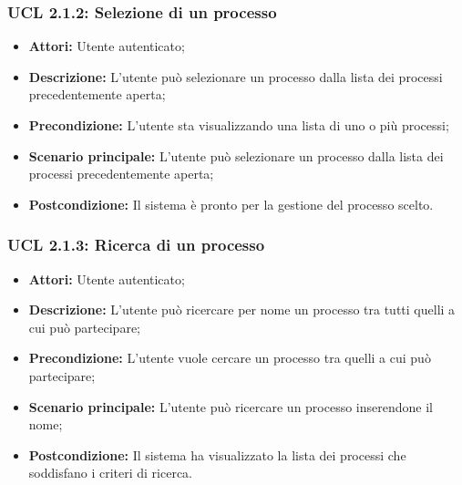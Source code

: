 \hypertarget{L2.1.2}{}
\subsubsection{UCL 2.1.2: Selezione di un processo}
\begin{itemize}
\item \textbf{Attori:} Utente autenticato;
\item \textbf{Descrizione:} L'utente può selezionare un processo dalla lista dei processi precedentemente aperta;
\item \textbf{Precondizione:} L'utente sta visualizzando una lista di uno o più processi;
\item \textbf{Scenario principale:} L'utente può selezionare un processo dalla lista dei processi precedentemente aperta;
\item \textbf{Postcondizione:} Il sistema è pronto per la gestione del processo scelto.
\end{itemize}

\hypertarget{L2.1.3}{}
\subsubsection{UCL 2.1.3: Ricerca di un processo}
\begin{itemize}
\item \textbf{Attori:} Utente autenticato;
\item \textbf{Descrizione:} L'utente può ricercare per nome un processo tra tutti quelli a cui può partecipare;
\item \textbf{Precondizione:} L'utente vuole cercare un processo tra quelli a cui può partecipare;
\item \textbf{Scenario principale:} L'utente può ricercare un processo inserendone il nome;
\item \textbf{Postcondizione:} Il sistema ha visualizzato la lista dei processi che soddisfano i criteri di ricerca.
\end{itemize}

\hypertarget{L2.2}{}
